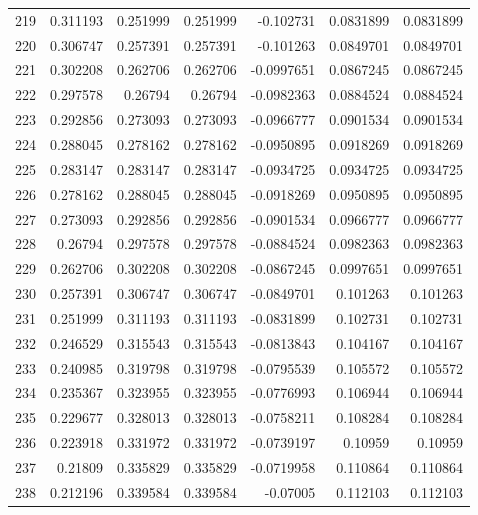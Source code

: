 \begin{tabular}{rrrrrrr}
 219 &  0.311193    & 0.251999    & 0.251999    & -0.102731    & 0.0831899   & 0.0831899   \\
 220 &  0.306747    & 0.257391    & 0.257391    & -0.101263    & 0.0849701   & 0.0849701   \\
 221 &  0.302208    & 0.262706    & 0.262706    & -0.0997651   & 0.0867245   & 0.0867245   \\
 222 &  0.297578    & 0.26794     & 0.26794     & -0.0982363   & 0.0884524   & 0.0884524   \\
 223 &  0.292856    & 0.273093    & 0.273093    & -0.0966777   & 0.0901534   & 0.0901534   \\
 224 &  0.288045    & 0.278162    & 0.278162    & -0.0950895   & 0.0918269   & 0.0918269   \\
 225 &  0.283147    & 0.283147    & 0.283147    & -0.0934725   & 0.0934725   & 0.0934725   \\
 226 &  0.278162    & 0.288045    & 0.288045    & -0.0918269   & 0.0950895   & 0.0950895   \\
 227 &  0.273093    & 0.292856    & 0.292856    & -0.0901534   & 0.0966777   & 0.0966777   \\
 228 &  0.26794     & 0.297578    & 0.297578    & -0.0884524   & 0.0982363   & 0.0982363   \\
 229 &  0.262706    & 0.302208    & 0.302208    & -0.0867245   & 0.0997651   & 0.0997651   \\
 230 &  0.257391    & 0.306747    & 0.306747    & -0.0849701   & 0.101263    & 0.101263    \\
 231 &  0.251999    & 0.311193    & 0.311193    & -0.0831899   & 0.102731    & 0.102731    \\
 232 &  0.246529    & 0.315543    & 0.315543    & -0.0813843   & 0.104167    & 0.104167    \\
 233 &  0.240985    & 0.319798    & 0.319798    & -0.0795539   & 0.105572    & 0.105572    \\
 234 &  0.235367    & 0.323955    & 0.323955    & -0.0776993   & 0.106944    & 0.106944    \\
 235 &  0.229677    & 0.328013    & 0.328013    & -0.0758211   & 0.108284    & 0.108284    \\
 236 &  0.223918    & 0.331972    & 0.331972    & -0.0739197   & 0.10959     & 0.10959     \\
 237 &  0.21809     & 0.335829    & 0.335829    & -0.0719958   & 0.110864    & 0.110864    \\
 238 &  0.212196    & 0.339584    & 0.339584    & -0.07005     & 0.112103    & 0.112103    \\

\end{tabular}
